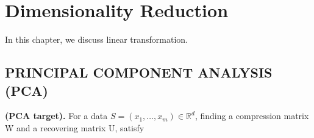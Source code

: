 
\section{Dimensionality Reduction}%
\label{sec:dimensionality_reduction}

In this chapter, we discuss linear transformation.

\subsection{PRINCIPAL COMPONENT ANALYSIS (PCA)}%
\label{sub:principal_component_analysis_pca_}

\begin{definition}
    \textbf{(PCA target).}
    For a data $ S = (x_1, \ldots, x_m) \in \mathbb{R}^d $, finding a compression matrix W and a recovering matrix U, satisfy
\end{definition}

